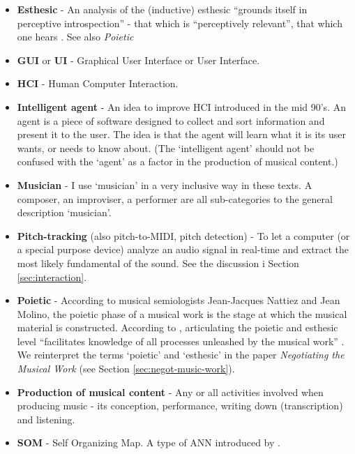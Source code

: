 \begin{itemize}
\item \textbf{Esthesic} - An analysis of the (inductive) esthesic
  ``grounds itself in perceptive introspection'' - that which is
  ``perceptively relevant'', that which one hears \cite[pp.
  140-3]{nattiez}. See also \emph{Poietic}

\item\textbf{GUI} or \textbf{UI} - Graphical User Interface or User
  Interface.

\item\textbf{HCI} - Human Computer Interaction.

\item \textbf{Intelligent agent} - An idea to improve HCI introduced in
  the mid 90's. An agent is a piece of software designed to collect
  and sort information and present it to the user. The idea is that
  the agent will learn what it is its user wants, or needs to know
  about. (The `intelligent agent' should not be confused with the
  `agent' as a factor in the production of musical content.)

\item \textbf{Musician} - I use `musician' in a very inclusive
  way in these texts. A composer, an improviser, a performer are all
  sub-categories to the general description `musician'.

\item\textbf{Pitch-tracking} (also pitch-to-MIDI, pitch detection) - To
  let a computer (or a special purpose device) analyze an audio signal
  in real-time and extract the most likely fundamental of the
  sound. See the discussion i Section \ref{sec:interaction}. 

\item \textbf{Poietic} - According to musical semiologists Jean-Jacques
  Nattiez and Jean Molino, the poietic phase of a musical work is the
  stage at which the musical material is constructed. According to
  \citet{nattiez}, articulating the poietic and esthesic level
  ``facilitates knowledge of all processes unleashed by the musical
  work'' \cite[pp. 92]{nattiez}. We reinterpret the terms `poietic'
  and `esthesic' in the paper \emph{Negotiating the Musical Work} (see
  Section \ref{sec:negot-music-work}).

\item\textbf{Production of musical content} - Any or all activities
  involved when producing music - its conception, performance, writing
  down (transcription) and listening.

\item \textbf{SOM} - Self Organizing Map. A type of ANN introduced by \citet{kohonen88}.


\end{itemize}

